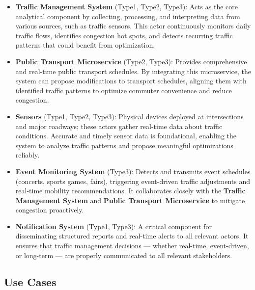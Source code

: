 \documentclass[a4paper,12pt]{article}
\begin{document}
\begin{itemize}
    \item \textbf{Traffic Management System} (Type1, Type2, Type3): Acts as the core analytical component by collecting, processing, and interpreting data from various sources, such as traffic sensors. This actor continuously monitors daily traffic flows, identifies congestion hot spots, and detects recurring traffic patterns that could benefit from optimization.
    \item \textbf{Public Transport Microservice} (Type2, Type3): Provides comprehensive and real-time public transport schedules. By integrating this microservice, the system can propose modifications to transport schedules, aligning them with identified traffic patterns to optimize commuter convenience and reduce congestion.
    \item \textbf{Sensors} (Type1, Type2, Type3): Physical devices deployed at intersections and major roadways; these actors gather real-time data about traffic conditions. Accurate and timely sensor data is foundational, enabling the system to analyze traffic patterns and propose meaningful optimizations reliably.
    \item \textbf{Event Monitoring System} (Type3): Detects and transmits event schedules (concerts, sports games, fairs), triggering event-driven traffic adjustments and real-time mobility recommendations. It collaborates closely with the \textbf{Traffic Management System} and \textbf{Public Transport Microservice} to mitigate congestion proactively.
    \item \textbf{Notification System} (Type1, Type3): A critical component for disseminating structured reports and real-time alerts to all relevant actors. It ensures that traffic management decisions — whether real-time, event-driven, or long-term — are properly communicated to all relevant stakeholders.
\end{itemize}

\newpage

\subsection{Use Cases}
\end{document}
